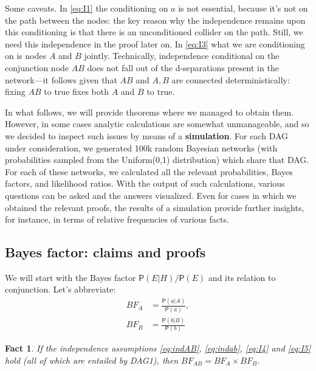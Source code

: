 \documentclass[
  10pt,
  dvipsnames,enabledeprecatedfontcommands]{scrartcl}
\newtheorem{fact}{Fact}
\newcommand{\pr}[1]{\ensuremath{\mathsf{P}(#1)}}
\begin{document}
Some caveats. In \eqref{eq:I1} the conditioning on \(a\) is not
essential, because it's not on the path between the nodes: the key
reason why the independence remains upon this conditioning is that there
is an unconditioned collider on the path. Still, we need this
independence in the proof later on. In \eqref{eq:I3} what we are
conditioning on is nodes \(A\) and \(B\) jointly. Technically,
independence conditional on the conjunction node \(AB\) does not fall
out of the d-separations present in the network---it follows given that
\(AB\) and \(A,B\) are connected deterministically: fixing \(AB\) to
true fixes both \(A\) and \(B\) to true.

In what follows, we will provide theorems where we managed to obtain
them. However, in some cases analytic calculations are somewhat
unmanageable, and so we decided to inspect such issues by means of a
\textbf{simulation}. For each DAG under consideration, we generated 100k
random Bayesian networks (with probabilities sampled from the
\textsf{Uniform(0,1)} distribution) which share that DAG. For each of
these networks, we calculated all the relevant probabilities, Bayes
factors, and likelihood ratios. With the output of such calculations,
various questions can be asked and the answers visualized. Even for
cases in which we obtained the relevant proofs, the results of a
simulation provide further insights, for instance, in terms of relative
frequencies of various facts.

\hypertarget{bayes-factor-claims-and-proofs}{%
\subsection*{Bayes factor: claims and
proofs}\label{bayes-factor-claims-and-proofs}}

We will start with the Bayes factor \(\pr{E \vert H}/\pr{E}\) and its
relation to conjunction. Let's abbreviate: \begin{align*}
BF_A  & =  \frac{\pr{a \vert A}}{\pr{a}},\\
BF_B & = \frac{\pr{b \vert B}}{\pr{b}}
\end{align*}

\begin{fact} If the independence assumptions \eqref{eq:indAB}, \eqref{eq:indab}, \eqref{eq:I4} and \eqref{eq:I5} hold (all of which are entailed by \textsf{DAG1}), then 
$BF_{AB} = BF_A \times BF_B$. \label{fac:BFindep}
\end{fact}
\end{document}
